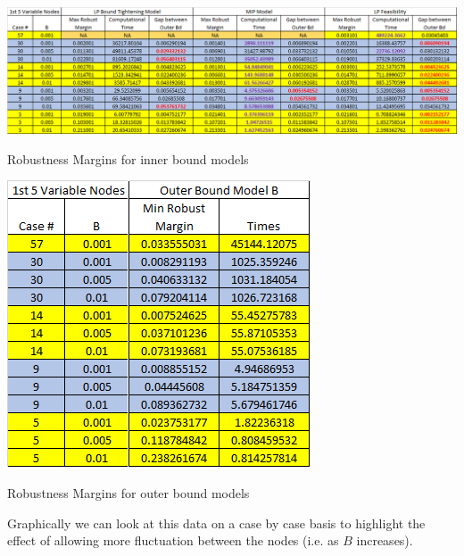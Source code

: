 \documentclass[11pt]{article}
\theoremstyle{plain}
\theoremstyle{definition}
\theoremstyle{remark}
\begin{document}
\begin{table}[h]
\begin{center}
\includegraphics[scale=0.5]{Figures/InnerBoundTable}
\caption{Robustness Margins for inner bound models } 
\vspace{0.2in}
\includegraphics[scale=0.5]{Figures/OuterBoundTable}
\caption{Robustness Margins for outer bound models}
\end{center}
\end{table} 

Graphically we can look at this data on a case by case basis to highlight the effect of allowing more fluctuation between the nodes (i.e. as $B$ increases). \\
\end{document}
